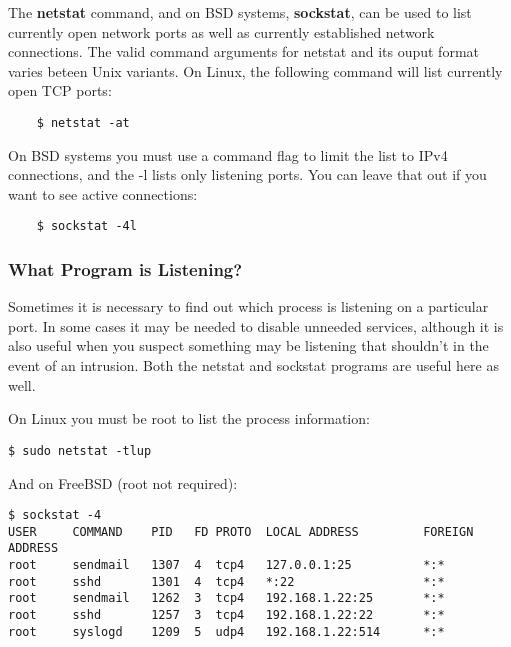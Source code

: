 The \textbf{netstat} command, and on BSD systems, \textbf{sockstat}, can be used to list currently open network ports as well as currently established network connections.  The valid command arguments for netstat and its ouput format varies beteen Unix variants. On Linux, the following command will list currently open TCP ports:

\begin{verbatim}
    $ netstat -at 
\end{verbatim}

On BSD systems you must use a command flag to limit the list to IPv4 connections, and the -l lists only listening ports.  You can leave that out if you want to see active connections:

\begin{verbatim}
    $ sockstat -4l
\end{verbatim}

\subsubsection{What Program is Listening?}

Sometimes it is necessary to find out which process is listening on a particular port.  In some cases it may be needed to disable unneeded services, although it is also useful when you suspect something may be listening that shouldn't in the event of an intrusion. Both the netstat and sockstat programs are useful here as well.

On Linux you must be root to list the process information: 

\begin{verbatim}
$ sudo netstat -tlup
\end{verbatim}

And on FreeBSD (root not required):

\begin{verbatim}
$ sockstat -4
USER     COMMAND    PID   FD PROTO  LOCAL ADDRESS         FOREIGN ADDRESS      
root     sendmail   1307  4  tcp4   127.0.0.1:25          *:*
root     sshd       1301  4  tcp4   *:22                  *:*
root     sendmail   1262  3  tcp4   192.168.1.22:25       *:*
root     sshd       1257  3  tcp4   192.168.1.22:22       *:*
root     syslogd    1209  5  udp4   192.168.1.22:514      *:*
\end{verbatim}


